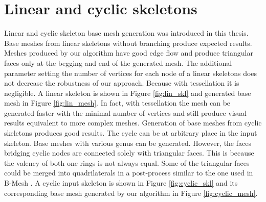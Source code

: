 \section{Linear and cyclic skeletons}

Linear and cyclic skeleton base mesh generation was introduced in this thesis.
Base meshes from linear skeletons without branching produce expected results.
Meshes produced by our algorithm have good edge flow and produce triangular faces only at the begging and end of the generated mesh.
The additional parameter setting the number of vertices for each node of a linear skeletons does not decrease the robustness of our approach.
Because with tessellation it is negligible.
A linear skeleton is shown in Figure \ref{fig:lin_skl} and generated base mesh in Figure \ref{fig:lin_mesh}.
In fact, with tessellation the mesh can be generated faster with the minimal number of vertices and still produce visual results equivalent to more complex meshes.
Generation of base meshes from cyclic skeletons produces good results.
The cycle can be at arbitrary place in the input skeleton.
Base meshes with various genus can be generated.
However, the faces bridging cyclic nodes are connected solely with triangular faces.
This is because the valency of both one rings is not always equal.
Some of the triangular faces could be merged into quadrilaterals in a post-process similar to the one used in B-Mesh \cite{ji_bm}.
A cyclic input skeleton is shown in Figure \ref{fig:cyclic_skl} and its corresponding base mesh generated by our algorithm in Figure \ref{fig:cyclic_mesh}.

